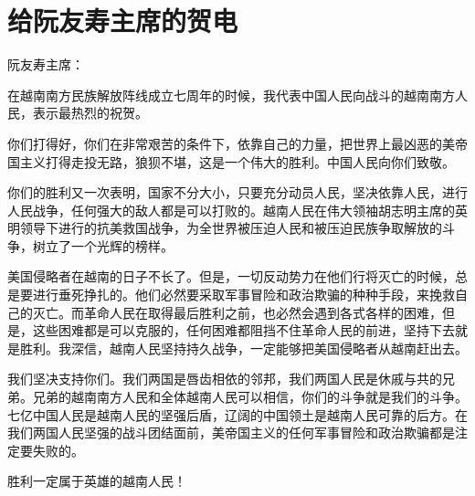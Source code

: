 \section[给阮友寿主席的贺电（一九六七年十二月十九日）]{给阮友寿主席的贺电}


阮友寿主席：

在越南南方民族解放阵线成立七周年的时候，我代表中国人民向战斗的越南南方人民，表示最热烈的祝贺。

你们打得好，你们在非常艰苦的条件下，依靠自己的力量，把世界上最凶恶的美帝国主义打得走投无路，狼狈不堪，这是一个伟大的胜利。中国人民向你们致敬。

你们的胜利又一次表明，国家不分大小，只要充分动员人民，坚决依靠人民，进行人民战争，任何强大的敌人都是可以打败的。越南人民在伟大领袖胡志明主席的英明领导下进行的抗美救国战争，为全世界被压迫人民和被压迫民族争取解放的斗争，树立了一个光辉的榜样。

美国侵略者在越南的日子不长了。但是，一切反动势力在他们行将灭亡的时候，总是要进行垂死挣扎的。他们必然要采取军事冒险和政治欺骗的种种手段，来挽救自己的灭亡。而革命人民在取得最后胜利之前，也必然会遇到各式各样的困难，但是，这些困难都是可以克服的，任何困难都阻挡不住革命人民的前进，坚持下去就是胜利。我深信，越南人民坚持持久战争，一定能够把美国侵略者从越南赶出去。

我们坚决支持你们。我们两国是唇齿相依的邻邦，我们两国人民是休戚与共的兄弟。兄弟的越南南方人民和全体越南人民可以相信，你们的斗争就是我们的斗争。七亿中国人民是越南人民的坚强后盾，辽阔的中国领土是越南人民可靠的后方。在我们两国人民坚强的战斗团结面前，美帝国主义的任何军事冒险和政治欺骗都是注定要失败的。

胜利一定属于英雄的越南人民！


